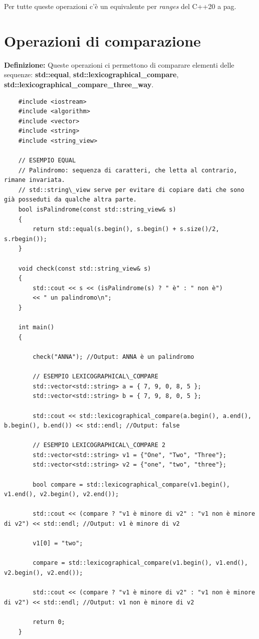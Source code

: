 \fleuron

\textsf{\small Per tutte queste operazioni c'è un equivalente per \emph{ranges} del C++20 a pag. \pageref{ranges}} \\


\newpage

\section{Operazioni di comparazione}

\textsf{\small \textbf{Definizione: } Queste operazioni ci permettono di comparare elementi delle sequenze: \textbf{std::equal}, \textbf{std::lexicographical\_compare}, \textbf{std::lexicographical\_compare\_three\_way}.} \\

\begin{lstlisting}
	#include <iostream>
	#include <algorithm>
	#include <vector>
	#include <string>
	#include <string_view>
	
	// ESEMPIO EQUAL
	// Palindromo: sequenza di caratteri, che letta al contrario, rimane invariata.
	// std::string\_view serve per evitare di copiare dati che sono già posseduti da qualche altra parte.
	bool isPalindrome(const std::string_view& s)
	{
		return std::equal(s.begin(), s.begin() + s.size()/2, s.rbegin());
	}
	
	void check(const std::string_view& s)
	{
		std::cout << s << (isPalindrome(s) ? " è" : " non è")
		<< " un palindromo\n";
	}
	
	int main()
	{
	
		check("ANNA"); //Output: ANNA è un palindromo
		
		// ESEMPIO LEXICOGRAPHICAL\_COMPARE
		std::vector<std::string> a = { 7, 9, 0, 8, 5 };
		std::vector<std::string> b = { 7, 9, 8, 0, 5 };
		
		std::cout << std::lexicographical_compare(a.begin(), a.end(), b.begin(), b.end()) << std::endl; //Output: false
		
		// ESEMPIO LEXICOGRAPHICAL\_COMPARE 2
		std::vector<std::string> v1 = {"One", "Two", "Three"};
		std::vector<std::string> v2 = {"one", "two", "three"};
		
		bool compare = std::lexicographical_compare(v1.begin(), v1.end(), v2.begin(), v2.end());
		
		std::cout << (compare ? "v1 è minore di v2" : "v1 non è minore di v2") << std::endl; //Output: v1 è minore di v2
		
		v1[0] = "two";
		
		compare = std::lexicographical_compare(v1.begin(), v1.end(), v2.begin(), v2.end());
		
		std::cout << (compare ? "v1 è minore di v2" : "v1 non è minore di v2") << std::endl; //Output: v1 non è minore di v2
		
		return 0;
	}
\end{lstlisting}

